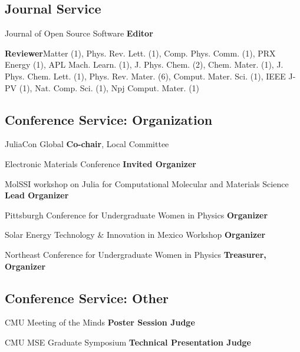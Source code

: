 \subsection{Journal Service}

{Journal of Open Source Software}
{\textbf{Editor}}
{}

{}
                     {\textbf{Reviewer}}{Matter (1), Phys. Rev. Lett. (1), Comp. Phys. Comm. (1), PRX Energy (1), APL Mach. Learn. (1), J. Phys. Chem. (2), Chem. Mater. (1), J. Phys. Chem. Lett. (1), Phys. Rev.  Mater. (6), Comput. Mater. Sci. (1), IEEE J-PV (1), Nat. Comp. Sci. (1), Npj Comput. Mater. (1)}

\vspace{-2mm}
\subsection{Conference Service: Organization}
                      {JuliaCon Global}
                      {\textbf{Co-chair}, Local Committee}
                        {}

{Electronic Materials Conference}
{\textbf{Invited Organizer}}
{}

{MolSSI workshop on Julia for Computational Molecular and Materials Science}
{\textbf{Lead Organizer}}
{}

{Pittsburgh Conference for Undergraduate Women in Physics}
{\textbf{Organizer}}
{}

{Solar Energy Technology \& Innovation in Mexico Workshop}
{\textbf{Organizer}}
{}

{Northeast Conference for Undergraduate Women in Physics}
{\textbf{Treasurer, Organizer}}
{}

\vspace{-2mm}
\subsection{Conference Service: Other}

{CMU Meeting of the Minds}
{\textbf{Poster Session Judge}}
{}


{CMU MSE Graduate Symposium}
{\textbf{Technical Presentation Judge}}
{}

